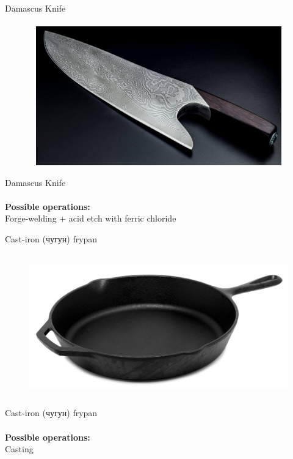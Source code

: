 \documentclass[aspectratio=169]{beamer}
\begin{document}
\begin{frame}[c]{Damascus Knife}
\framesubtitle{}
    \vspace{-0.6cm}
    \begin{figure}[H]
        \centering\includegraphics[height=6cm,width=1\textwidth,keepaspectratio]{Image_17.png}
        \label{fig:Image_17.png}
    \end{figure}
\end{frame}

\begin{frame}[c]{Damascus Knife}
    \framesubtitle{}
        \LARGE \centering
        \textbf{Possible operations: } \\ 
        Forge-welding + acid etch with ferric chloride\\
    \end{frame}

\begin{frame}[c]{Cast-iron (чугун) frypan}
\framesubtitle{}
    \vspace{-0.6cm}
    \begin{figure}[H]
        \centering\includegraphics[height=6cm,width=1\textwidth,keepaspectratio]{cast_iron.png}
        \label{fig:cast_iron.png}
    \end{figure}
\end{frame}

\begin{frame}[c]{Cast-iron (чугун) frypan}
    \framesubtitle{}
        \LARGE \centering
        \textbf{Possible operations: } \\ 
        Casting\\
    \end{frame}
\end{document}

